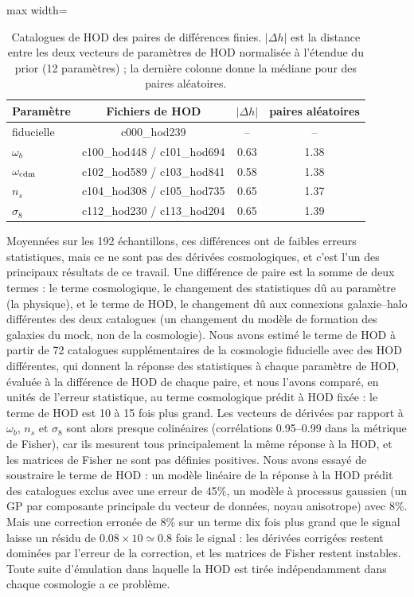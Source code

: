 \begin{table}[!htbp]
\centering\small
\begin{adjustbox}{max width=\linewidth}
\begin{tabular}{lccc}
\toprule
Paramètre & Fichiers de HOD & $|\Delta h|$ & paires aléatoires \\
\midrule
fiducielle & c000\_hod239 & -- & -- \\
$\omega_b$ & c100\_hod448 / c101\_hod694 & 0.63 & 1.38 \\
$\omega_{\rm cdm}$ & c102\_hod589 / c103\_hod841 & 0.58 & 1.38 \\
$n_s$ & c104\_hod308 / c105\_hod735 & 0.65 & 1.37 \\
$\sigma_8$ & c112\_hod230 / c113\_hod204 & 0.65 & 1.39 \\
\bottomrule
\end{tabular}
\end{adjustbox}
\caption{Catalogues de HOD des paires de différences finies. $|\Delta h|$ est la distance entre les deux vecteurs de paramètres de HOD normalisée à l'étendue du prior (12 paramètres) ; la dernière colonne donne la médiane pour des paires aléatoires.}
\label{tab:hods}
\end{table}

Moyennées sur les 192 échantillons, ces différences ont de faibles erreurs statistiques, mais ce ne sont pas des dérivées cosmologiques, et c'est l'un des principaux résultats de ce travail. Une différence de paire est la somme de deux termes : le terme cosmologique, le changement des statistiques dû au paramètre (la physique), et le terme de HOD, le changement dû aux connexions galaxie--halo différentes des deux catalogues (un changement du modèle de formation des galaxies du mock, non de la cosmologie). Nous avons estimé le terme de HOD à partir de 72 catalogues supplémentaires de la cosmologie fiducielle avec des HOD différentes, qui donnent la réponse des statistiques à chaque paramètre de HOD, évaluée à la différence de HOD de chaque paire, et nous l'avons comparé, en unités de l'erreur statistique, au terme cosmologique prédit à HOD fixée : le terme de HOD est 10 à 15 fois plus grand. Les vecteurs de dérivées par rapport à $\omega_b$, $n_s$ et $\sigma_8$ sont alors presque colinéaires (corrélations 0.95--0.99 dans la métrique de Fisher), car ils mesurent tous principalement la même réponse à la HOD, et les matrices de Fisher ne sont pas définies positives. Nous avons essayé de soustraire le terme de HOD : un modèle linéaire de la réponse à la HOD prédit des catalogues exclus avec une erreur de 45\%, un modèle à processus gaussien (un GP par composante principale du vecteur de données, noyau anisotrope) avec 8\%. Mais une correction erronée de 8\% sur un terme dix fois plus grand que le signal laisse un résidu de $0.08\times10\simeq0.8$ fois le signal : les dérivées corrigées restent dominées par l'erreur de la correction, et les matrices de Fisher restent instables. Toute suite d'émulation dans laquelle la HOD est tirée indépendamment dans chaque cosmologie a ce problème.

